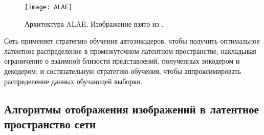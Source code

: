 \begin{enumerate}
\begin{figure}[h]
\begin{center}
    \texttt{[image: ALAE]}
    \caption{Архитектура ALAE. Изображение взято из \cite{ALAE}.}
    \label{fig:alae}
\end{center}
\end{figure}

Сеть применяет стратегию обучения автоэнкодеров, чтобы получить оптимальное латентное распределение в промежуточном латентном пространстве, накладывая ограничение о взаимной близости представлений, полученных энкодером и декодером;
и состязательную стратегию обучения, чтобы аппроксимировать распределение данных обучающей выборки.

\end{enumerate}

\subsection{Алгоритмы отображения изображений в латентное пространство сети}

